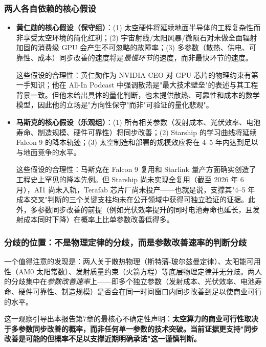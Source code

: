 \subsubsection{两人各自依赖的核心假设}

\begin{itemize}[leftmargin=*]
    \item \textbf{黄仁勋的核心假设（保守组）}：(1) 太空硬件将延续地面半导体的工程复杂性而非享受太空环境的简化红利；(2) 宇宙射线/太阳风暴/微陨石对未做全面辐射加固的消费级 GPU 会产生不可忽略的故障率；(3) 多参数（散热、供电、可靠性、成本）同步改善的速度将是\emph{最慢环节}的速度，而非最快环节的速度。
    
    这些假设的合理性：黄仁勋作为 NVIDIA CEO 对 GPU 芯片的物理约束有第一手知识；他在 All-In Podcast 中强调散热是"最大技术壁垒"的表述与其工程背景一致。但他未给出具体的量化判断，也未提供散热、可靠性和成本的数学模型，因此他的立场是"方向性保守"而非"可验证的量化悲观"。

    \item \textbf{马斯克的核心假设（乐观组）}：(1) 所有相关参数（发射成本、光伏效率、电池寿命、制造规模、硬件可靠性）将同步改善；(2) Starship 的学习曲线将延续 Falcon 9 的降本轨迹；(3) 太空制造和部署的规模效应将在 4--5 年内达到足以与地面竞争的水平。
    
    这些假设的合理性：马斯克在 Falcon 9 复用和 Starlink 量产方面确实创造了工程史上罕见的降本先例。但 Starship 尚未实现全复用（截至 2026 年 6 月），AI1 尚未入轨，Terafab 芯片厂尚未投产——也就是说，支撑其"4--5 年成本交叉"判断的三个关键支柱均未在公开领域中获得可独立验证的证据。此外，多参数同步改善的前提（例如光伏效率提升的同时电池寿命也延长，且发射成本同时下降）在概率上比单参数改善低得多。
\end{itemize}

\subsubsection{分歧的位置：不是物理定律的分歧，而是参数改善速率的判断分歧}

一个值得注意的发现是：两人关于散热物理（斯特藩-玻尔兹曼定律）、太阳能可用性（AM0 太阳常数）、发射质量约束（火箭方程）等底层物理定律并无分歧。两人的分歧集中在\emph{参数改善速率}上——即多个独立参数（发射成本、光伏效率、电池寿命、硬件可靠性、制造规模）是否会在同一时间窗口内同步改善到足以使商业可行的水平。

这一观察引导出本报告第7章的最核心不确定性声明：\textbf{太空算力的商业可行性取决于多参数同步改善的概率，而非任何单一参数的技术突破。当前证据更支持"同步改善是可能的但概率不足以支撑近期明确承诺"这一谨慎判断。}

